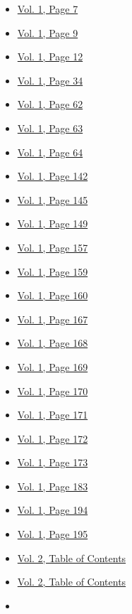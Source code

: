 \begin{itemize}
  \begin{itemize}
  \tightlist
  \item
    \protect\hyperlink{g-page-15}{Vol. 1, Page 7}
  \item
    \protect\hyperlink{g-page-17}{Vol. 1, Page 9}
  \item
    \protect\hyperlink{g-page-20}{Vol. 1, Page 12}
  \item
    \protect\hyperlink{g-page-42}{Vol. 1, Page 34}
  \item
    \protect\hyperlink{g-page-70}{Vol. 1, Page 62}
  \item
    \protect\hyperlink{g-page-71}{Vol. 1, Page 63}
  \item
    \protect\hyperlink{g-page-72}{Vol. 1, Page 64}
  \item
    \protect\hyperlink{g-page-150}{Vol. 1, Page 142}
  \item
    \protect\hyperlink{g-page-153}{Vol. 1, Page 145}
  \item
    \protect\hyperlink{g-page-157}{Vol. 1, Page 149}
  \item
    \protect\hyperlink{g-page-165}{Vol. 1, Page 157}
  \item
    \protect\hyperlink{g-page-167}{Vol. 1, Page 159}
  \item
    \protect\hyperlink{g-page-168}{Vol. 1, Page 160}
  \item
    \protect\hyperlink{g-page-175}{Vol. 1, Page 167}
  \item
    \protect\hyperlink{g-page-176}{Vol. 1, Page 168}
  \item
    \protect\hyperlink{g-page-177}{Vol. 1, Page 169}
  \item
    \protect\hyperlink{g-page-178}{Vol. 1, Page 170}
  \item
    \protect\hyperlink{g-page-179}{Vol. 1, Page 171}
  \item
    \protect\hyperlink{g-page-180}{Vol. 1, Page 172}
  \item
    \protect\hyperlink{g-page-181}{Vol. 1, Page 173}
  \item
    \protect\hyperlink{g-page-191}{Vol. 1, Page 183}
  \item
    \protect\hyperlink{g-page-202}{Vol. 1, Page 194}
  \item
    \protect\hyperlink{g-page-203}{Vol. 1, Page 195}
  \item
    \protect\hyperlink{g-page-209}{Vol. 2, Table of Contents}
  \item
    \protect\hyperlink{g-page-211}{Vol. 2, Table of Contents}
  \item

\end{itemize}
\end{itemize}
